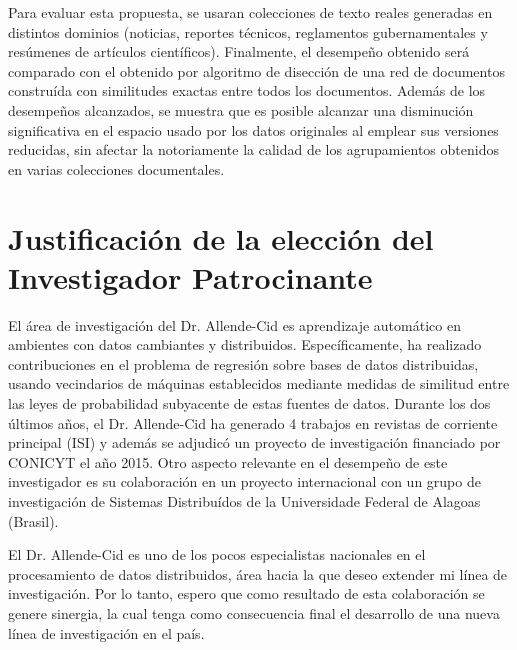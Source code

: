 \documentclass[10pt]{article}
\begin{document}
Para evaluar esta propuesta, se usaran colecciones de texto reales generadas en distintos dominios (noticias, reportes técnicos, reglamentos gubernamentales y resúmenes de artículos científicos). Finalmente, el desempe\~no obtenido será comparado con el obtenido por algoritmo de disección de una red de documentos construída con similitudes exactas entre todos los documentos. Además de los desempeños alcanzados, se muestra que es posible alcanzar una disminución significativa en el espacio usado por los datos originales al emplear sus versiones reducidas, sin afectar la notoriamente la calidad de los agrupamientos obtenidos en varias colecciones documentales.

\section{Justificación de la elección del Investigador Patrocinante}
El área de investigación del Dr. Allende-Cid es aprendizaje automático en ambientes con datos cambiantes y distribuidos. Específicamente, ha realizado contribuciones en el problema de regresión sobre bases de datos distribuidas, usando vecindarios de máquinas establecidos mediante medidas de similitud entre las leyes de probabilidad subyacente de estas fuentes de datos. Durante los dos últimos a\~nos, el Dr. Allende-Cid ha generado 4 trabajos en revistas de corriente principal (ISI) y además se adjudicó un proyecto de investigación financiado por CONICYT el a\~no 2015. Otro aspecto relevante en el desempe\~no de este investigador es su colaboración en un proyecto internacional con un grupo de investigación de Sistemas Distribuídos de la Universidade Federal de Alagoas (Brasil).

El Dr. Allende-Cid es uno de los pocos especialistas nacionales en el procesamiento de datos distribuidos, área hacia la que deseo extender mi línea de investigación. Por lo tanto, espero que como resultado de esta colaboración se genere sinergia, la cual tenga como consecuencia final el desarrollo de una nueva línea de investigación en el país.
\end{document}
